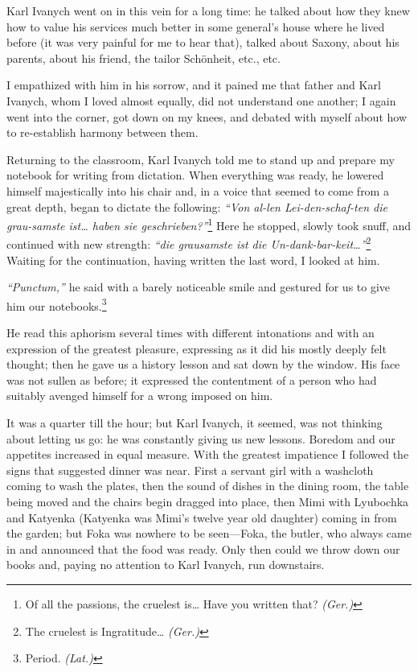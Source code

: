 Karl Ivanych went on in this vein for a long time: he talked about how they knew how to value his services much better in some general's house where he lived before (it was very painful for me to hear that), talked about Saxony, about his parents, about his friend, the tailor Sch\"onheit, etc., etc.

I empathized with him in his sorrow, and it pained me that father and Karl Ivanych, whom I loved almost equally, did not understand one another; I again went into the corner, got down on my knees, and debated with myself about how to re-establish harmony between them.

Returning to the classroom, Karl Ivanych told me to stand up and prepare my notebook for writing from dictation. When everything was ready, he lowered himself majestically into his chair and, in a voice that seemed to come from a great depth, began to dictate the following: \textit{``Von al-len Lei-den-schaf-ten die grau-samste ist\ldots{} haben sie geschrieben?''}\footnote{Of all the passions, the cruelest is\ldots{} Have you written that? \textit{(Ger.)}} Here he stopped, slowly took snuff, and continued with new strength: \textit{``die grausamste ist die Un-dank-bar-keit\ldots{}''}\footnote{The cruelest is Ingratitude\ldots{} \textit{(Ger.)}} Waiting for the continuation, having written the last word, I looked at him. %

\textit{``Punctum,''} he said with a barely noticeable smile and gestured for us to give him our notebooks.\footnote{Period. \textit{(Lat.)}} %

He read this aphorism several times with different intonations and with an expression of the greatest pleasure, expressing as it did his mostly deeply felt thought; then he gave us a history lesson and sat down by the window. His face was not sullen as before; it expressed the contentment of a person who had suitably avenged himself for a wrong imposed on him.

It was a quarter till the hour; but Karl Ivanych, it seemed, was not thinking about letting us go: he was constantly giving us new lessons. Boredom and our appetites increased in equal measure. With the greatest impatience I followed the signs that suggested dinner was near. First a servant girl with a washcloth coming to wash the plates, then the sound of dishes in the dining room, the table being moved and the chairs begin dragged into place, then Mimi with Lyubochka and Katyenka (Katyenka was Mimi's twelve year old daughter) coming in from the garden; but Foka was nowhere to be seen---Foka, the butler, who always came in and announced that the food was ready. Only then could we throw down our books and, paying no attention to Karl Ivanych, run downstairs.

